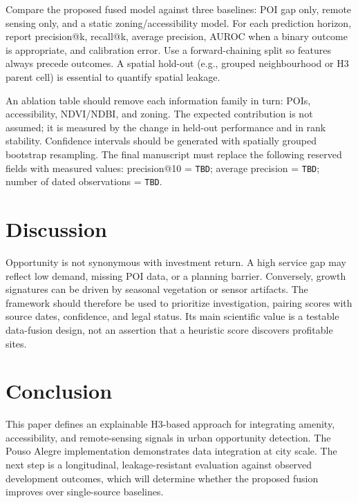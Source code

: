 \documentclass[conference]{IEEEtran}
\begin{document}
Compare the proposed fused model against three baselines: POI gap only, remote sensing only, and a static zoning/accessibility model. For each prediction horizon, report precision@k, recall@k, average precision, AUROC when a binary outcome is appropriate, and calibration error. Use a forward-chaining split so features always precede outcomes. A spatial hold-out (e.g., grouped neighbourhood or H3 parent cell) is essential to quantify spatial leakage.

An ablation table should remove each information family in turn: POIs, accessibility, NDVI/NDBI, and zoning. The expected contribution is not assumed; it is measured by the change in held-out performance and in rank stability. Confidence intervals should be generated with spatially grouped bootstrap resampling. The final manuscript must replace the following reserved fields with measured values: precision@10 = \texttt{TBD}; average precision = \texttt{TBD}; number of dated observations = \texttt{TBD}.

\section{Discussion}
Opportunity is not synonymous with investment return. A high service gap may reflect low demand, missing POI data, or a planning barrier. Conversely, growth signatures can be driven by seasonal vegetation or sensor artifacts. The framework should therefore be used to prioritize investigation, pairing scores with source dates, confidence, and legal status. Its main scientific value is a testable data-fusion design, not an assertion that a heuristic score discovers profitable sites.

\section{Conclusion}
This paper defines an explainable H3-based approach for integrating amenity, accessibility, and remote-sensing signals in urban opportunity detection. The Pouso Alegre implementation demonstrates data integration at city scale. The next step is a longitudinal, leakage-resistant evaluation against observed development outcomes, which will determine whether the proposed fusion improves over single-source baselines.



\end{document}
